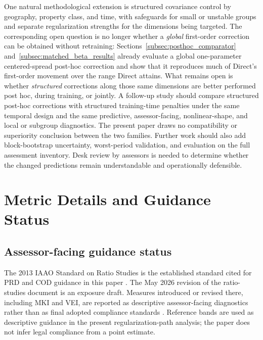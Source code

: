 \documentclass[10pt]{article}
\theoremstyle{definition}
\newcommand{\1}{\mathbf{1}}
\begin{document}
One natural methodological extension is structured covariance control by geography, property class, and time, with safeguards for small or unstable groups and separate regularization strengths for the dimensions being targeted. The corresponding open question is no longer whether a \emph{global} first-order correction can be obtained without retraining: Sections~\ref{subsec:posthoc_comparator} and~\ref{subsec:matched_beta_results} already evaluate a global one-parameter centered-spread post-hoc correction and show that it reproduces much of Direct's first-order movement over the range Direct attains. What remains open is whether \emph{structured} corrections along those same dimensions are better performed post hoc, during training, or jointly. A follow-up study should compare structured post-hoc corrections with structured training-time penalties under the same temporal design and the same predictive, assessor-facing, nonlinear-shape, and local or subgroup diagnostics. The present paper draws no compatibility or superiority conclusion between the two families. Further work should also add block-bootstrap uncertainty, worst-period validation, and evaluation on the full assessment inventory. Desk review by assessors is needed to determine whether the changed predictions remain understandable and operationally defensible.


\printbibliography


\appendix

\section{Metric Details and Guidance Status}
\label{app:metrics}

\subsection{Assessor-facing guidance status}

The 2013 IAAO Standard on Ratio Studies is the established standard cited for PRD
and COD guidance in this paper \cite{IAAO2013Ratio}. The May 2026 revision of the
ratio-studies document is an exposure draft. Measures introduced or revised there,
including MKI and VEI, are reported as descriptive assessor-facing diagnostics rather than as
final adopted compliance standards \cite{IAAO2026ExposureRatio}. Reference bands
are used as descriptive guidance in the present
regularization-path analysis; the paper does not
infer legal compliance from a point estimate.
\end{document}
